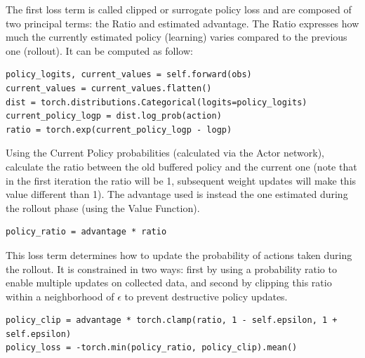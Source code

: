 \documentclass[main.tex]{subfiles}
\begin{document}
The first loss term is called clipped or surrogate policy loss and are composed of two principal terms: the Ratio and estimated advantage. The Ratio expresses how much the currently estimated policy (learning) varies compared to the previous one (rollout). It can be computed as follow:
\begin{listing}[H]
	\centering
	\caption{Target return computation respect GAE value} 
	\label{codice:tr}
	\begin{verbatim}
policy_logits, current_values = self.forward(obs)
current_values = current_values.flatten()
dist = torch.distributions.Categorical(logits=policy_logits)
current_policy_logp = dist.log_prob(action)
ratio = torch.exp(current_policy_logp - logp)
	\end{verbatim}
\end{listing}
 
Using the Current Policy probabilities (calculated via the Actor network), calculate the ratio between the old buffered policy and the current one (note that in the first iteration the ratio will be 1, subsequent weight updates will make this value different than 1). The advantage used is instead the one estimated during the rollout phase (using the Value Function).

\begin{listing}[H]
	\centering
	\caption{Computation for Policy} 
	\label{codice:ratio}
	\begin{verbatim}
policy_ratio = advantage * ratio
	\end{verbatim}
\end{listing}

This loss term determines how to update the probability of actions taken during the rollout. It is constrained in two ways: first by using a probability ratio to enable multiple updates on collected data, and second by clipping this ratio within a neighborhood of $\epsilon$ to prevent destructive policy updates.
\begin{listing}[H]
	\centering
	\caption{Computation surrogate policy loss} 
	\label{codice:policy_loss}
	\begin{verbatim}
policy_clip = advantage * torch.clamp(ratio, 1 - self.epsilon, 1 + self.epsilon)
policy_loss = -torch.min(policy_ratio, policy_clip).mean()
	\end{verbatim}
\end{listing}
\end{document}
